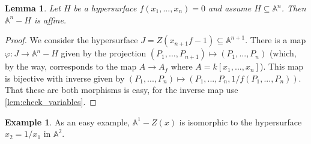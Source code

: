 \documentclass[12pt]{article}
\theoremstyle{plain}
\newtheorem{lemma}[thm]{Lemma}
\theoremstyle{definition}
\newtheorem{example}[thm]{Example}
\newcommand{\bb}[1]{\mathbb{#1}}
\newcommand{\lto}{\longrightarrow}
\begin{document}
\begin{lemma}\label{lem:ambient_hypersurface_affine}
Let $H$ be a hypersurface $f(x_1,...,x_n) = 0$ and assume $H \subseteq \bb{A}^n$. Then $\bb{A}^n - H$ is affine.
\end{lemma}
\begin{proof}
We consider the hypersurface $J = Z(x_{n+1}f - 1) \subseteq \bb{A}^{n+1}$. There is a map $\varphi: J \lto \bb{A}^n - H$ given by the projection $(P_1,...,P_{n+1}) \longmapsto (P_1,...,P_n)$ (which, by the way, corresponds to the map $A \lto A_f$ where $A = k[x_1,...,x_n]$). This map is bijective with inverse given by $(P_1,...,P_n) \longmapsto (P_1,...,P_n,1/f(P_1,...,P_n))$. That these are both morphisms is easy, for the inverse map use \ref{lem:check_variables}.
\end{proof}
\begin{example}
As an easy example, $\bb{A}^1 - Z(x)$ is isomorphic to the hypersurface $x_2 = 1/x_1$ in $\bb{A}^2$.
\end{example}
\end{document}
